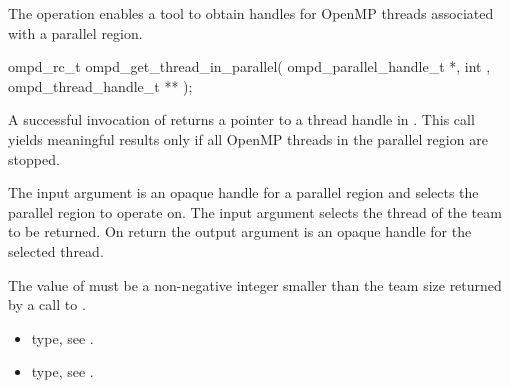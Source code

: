 
\label{ompd:ompd_get_thread_in_parallel}
\summary
The   operation enables a tool to obtain handles for 
OpenMP threads associated with a parallel region.

\format

\begin{cspecific}
\begin{ompSyntax}
ompd_rc_t ompd_get_thread_in_parallel(
  ompd_parallel_handle_t *,
  int ,
  ompd_thread_handle_t **
);
\end{ompSyntax}
\end{cspecific}


\descr
A successful invocation of   returns a pointer to 
a thread handle in . 
This call yields meaningful results only if all OpenMP threads in the parallel 
region are stopped.

\argdesc
The input argument  is an opaque handle for a parallel region
 and selects the parallel region to operate on.
The input argument  selects the thread of the team to be returned. 
On return the output argument  is an opaque handle for the selected thread.

\restrictions
The value of  must be a non-negative integer smaller than the
team size returned by a call to .

\crossreferences
\begin{itemize}
	\item {} type, see .
	\item {} type, see .
\end{itemize}

